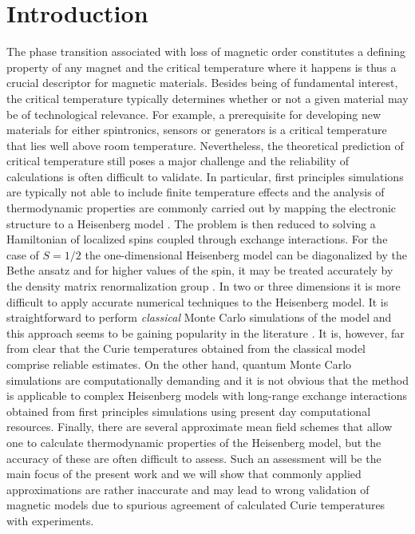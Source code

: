 \documentclass[aps,prb,reprint,floatfix,superscriptaddress]{revtex4-2}
\begin{document}
\maketitle

\section{Introduction}
The phase transition associated with loss of magnetic order constitutes a defining property of any magnet and the critical temperature where it happens is thus a crucial descriptor for magnetic materials. Besides being of fundamental interest, the critical temperature typically determines whether or not a given material may be of technological relevance. For example, a prerequisite for developing new materials for either spintronics, sensors or generators is a critical temperature that lies well above room temperature. Nevertheless, the theoretical prediction of critical temperature still poses a major challenge and the reliability of calculations is often difficult to validate. In particular, first principles simulations are typically not able to include finite temperature effects and the analysis of thermodynamic properties are commonly carried out by mapping the electronic structure to a Heisenberg model \cite{Illas1998,Xiang2013, Torelli2019b,Torelli2020}. The problem is then reduced to solving a Hamiltonian of localized spins coupled through exchange interactions. For the case of $S=1/2$ the one-dimensional Heisenberg model can be  diagonalized by the Bethe ansatz \cite{Karabach1997,Karbach1998} and for higher values of the spin, it may be treated accurately by the density matrix renormalization group \cite{PhysRevB.48.3844}. In two or three dimensions it is more difficult to apply accurate numerical techniques to the Heisenberg model. It is straightforward to perform \textit{classical} Monte Carlo simulations of the model and this approach seems to be gaining popularity in the literature \cite{Akturk2017,Torelli_2019, Kim2021,Li2022,Shen2022}. It is, however, far from clear that the Curie temperatures obtained from the classical model comprise reliable estimates. On the other hand, quantum Monte Carlo simulations \cite{Xiang1998} are computationally demanding and it is not obvious that the method is applicable to complex Heisenberg models with long-range exchange interactions obtained from first principles simulations using present day computational resources. Finally, there are several approximate mean field schemes that allow one to calculate thermodynamic properties of the Heisenberg model, but the accuracy of these are often difficult to assess. Such an assessment will be the main focus of the present work and we will show that commonly applied approximations are rather inaccurate and may lead to wrong validation of magnetic models due to spurious agreement of calculated Curie temperatures with experiments.
\end{document}
